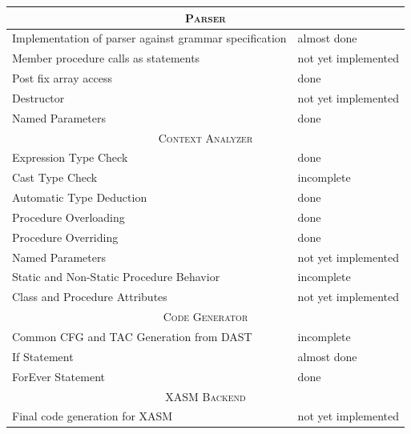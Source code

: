 \documentclass{report}
\def\done{\textcolor{weakGreen}{done}}
\def\almdone{\textcolor{weakYellow}{almost done}}
\def\incompl{\textcolor{weakOrange}{incomplete}}
\def\notimpl{\textcolor{weakRed}{not yet implemented}}
\begin{document}
\begin{center}
\begin{tabular}[ht]{ | p{} | p{} | }
	\hline
	\multicolumn{2}{|c|}{\textsc{Parser}} \\
	\hline
	Implementation of parser against grammar specification & \almdone \\
	\hline
	Member procedure calls as statements & \notimpl \\
	\hline
	Post fix array access & \done \\
	\hline
	Destructor & \notimpl \\
	\hline
	Named Parameters & \done \\
	
	\hline \hline
	\multicolumn{2}{|c|}{\textsc{Context Analyzer}} \\
	\hline
	Expression Type Check & \done \\
	\hline
	Cast Type Check & \incompl \\
	\hline
	Automatic Type Deduction & \done \\
	\hline
	Procedure Overloading & \done \\
	\hline
	Procedure Overriding & \done \\
	\hline
	Named Parameters & \notimpl \\
	\hline
	Static and Non-Static Procedure Behavior & \incompl \\
	\hline
	Class and Procedure Attributes & \notimpl \\
	
	\hline \hline
	\multicolumn{2}{|c|}{\textsc{Code Generator}} \\
	\hline
	Common CFG and TAC Generation from DAST & \incompl \\
	\hline
	If Statement & \almdone \\
	\hline
	ForEver Statement & \done \\
	
	\hline \hline
	\multicolumn{2}{|c|}{\textsc{XASM Backend}} \\
	\hline
	Final code generation for XASM & \notimpl \\
	\hline
\end{tabular}
\end{center}


\tableofcontents


\end{document}
